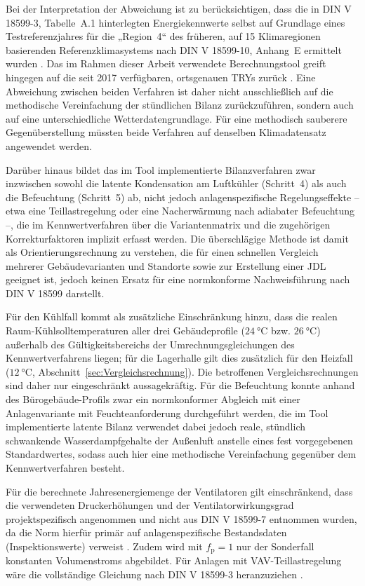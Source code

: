 \documentclass{scrreprt}
\begin{document}
Bei der Interpretation der Abweichung ist zu berücksichtigen, dass
die in DIN V 18599-3, Tabelle~A.1 hinterlegten Energiekennwerte
selbst auf Grundlage eines Testreferenzjahres für die
„Region~4“ des früheren, auf 15 Klimaregionen basierenden
Referenzklimasystems nach DIN V 18599-10, Anhang~E ermittelt wurden
\parencite{DIN185993,DIN1859910}. Das im Rahmen dieser Arbeit
verwendete Berechnungstool greift hingegen auf die seit 2017
verfügbaren, ortsgenauen \acp{TRY} zurück
\parencite{DWDBBR2017,Spekat2011}. Eine Abweichung zwischen beiden
Verfahren ist daher nicht ausschließlich auf die methodische
Vereinfachung der stündlichen Bilanz zurückzuführen, sondern auch auf
eine unterschiedliche Wetterdatengrundlage. Für eine methodisch
sauberere Gegenüberstellung müssten beide Verfahren auf denselben
Klimadatensatz angewendet werden.

Darüber hinaus bildet das im Tool implementierte Bilanzverfahren
zwar inzwischen sowohl die latente Kondensation am Luftkühler
(Schritt~4) als auch die Befeuchtung (Schritt~5) ab, nicht jedoch
anlagenspezifische Regelungseffekte -- etwa eine Teillastregelung
oder eine Nacherwärmung nach adiabater Befeuchtung --, die im
Kennwertverfahren über die Variantenmatrix und die zugehörigen
Korrekturfaktoren implizit erfasst werden. Die überschlägige Methode
ist damit als Orientierungsrechnung zu verstehen, die für einen
schnellen Vergleich mehrerer Gebäudevarianten und Standorte sowie zur
Erstellung einer \ac{JDL} geeignet ist, jedoch keinen Ersatz für eine
normkonforme Nachweisführung nach DIN V 18599 darstellt.

Für den Kühlfall kommt als zusätzliche Einschränkung hinzu, dass die
realen Raum-Kühlsolltemperaturen aller drei Gebäudeprofile
($\SI{24}{\celsius}$ bzw. $\SI{26}{\celsius}$) außerhalb des
Gültigkeitsbereichs der Umrechnungsgleichungen des Kennwertverfahrens
liegen; für die Lagerhalle gilt dies zusätzlich für den Heizfall
($\SI{12}{\celsius}$, Abschnitt~\ref{sec:Vergleichsrechnung}). Die
betroffenen Vergleichsrechnungen sind daher nur eingeschränkt
aussagekräftig. Für die Befeuchtung konnte anhand des
Bürogebäude-Profils zwar ein normkonformer Abgleich mit einer
Anlagenvariante mit Feuchteanforderung durchgeführt werden, die im
Tool implementierte latente Bilanz verwendet dabei jedoch
reale, stündlich schwankende Wasserdampfgehalte der Außenluft
anstelle eines fest vorgegebenen Standardwertes, sodass auch hier
eine methodische Vereinfachung gegenüber dem Kennwertverfahren
besteht.

Für die berechnete Jahresenergiemenge der Ventilatoren gilt
einschränkend, dass die verwendeten Druckerhöhungen und der
Ventilatorwirkungsgrad projektspezifisch angenommen und nicht aus
DIN V 18599-7 entnommen wurden, da die Norm hierfür primär auf
anlagenspezifische Bestandsdaten (Inspektionswerte) verweist
\parencite{DIN185997}. Zudem wird mit $f_{\mathrm{p}}=1$ nur der
Sonderfall konstanten Volumenstroms abgebildet. Für Anlagen mit
\ac{VAV}-Teillastregelung wäre die vollständige Gleichung nach
DIN V 18599-3 heranzuziehen \parencite{DIN185993}.
\end{document}

